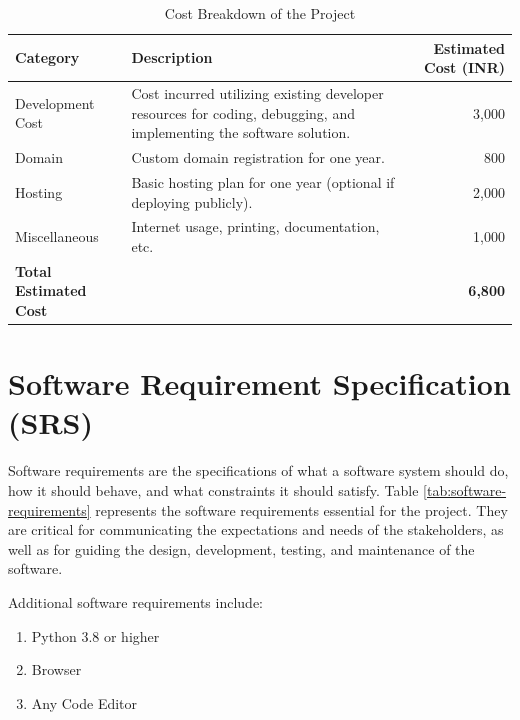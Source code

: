 \begin{table}[H]
    \centering
    \begin{tabular}{|l|p{8cm}|r|}
        \hline
        \textbf{Category} & \textbf{Description} & \textbf{Estimated Cost (INR)} \\ \hline
        Development Cost & Cost incurred utilizing existing developer resources for coding, debugging, and implementing the software solution. & 3,000 \\ \hline
        Domain & Custom domain registration for one year. & 800 \\ \hline
        Hosting & Basic hosting plan for one year (optional if deploying publicly). & 2,000 \\ \hline
        Miscellaneous & Internet usage, printing, documentation, etc. & 1,000 \\ \hline
        \textbf{Total Estimated Cost} &  & \textbf{6,800} \\ \hline
    \end{tabular}
    \caption{Cost Breakdown of the Project}
    \label{tab:cost-breakdown}
\end{table}

\section{Software Requirement Specification (SRS)}
Software requirements are the specifications of what a software system should do, how it should behave, and what constraints it should satisfy. Table \ref{tab:software-requirements} represents the software requirements essential for the project. They are critical for communicating the expectations and needs of the stakeholders, as well as for guiding the design, development, testing, and maintenance of the software.

Additional software requirements include:
\begin{enumerate}
    \item Python 3.8 or higher
    \item Browser
    \item Any Code Editor
\end{enumerate}


